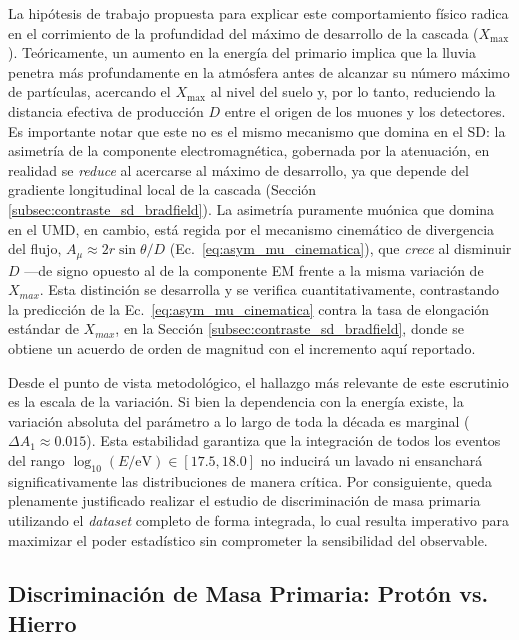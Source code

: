 La hipótesis de trabajo propuesta para explicar este comportamiento físico radica en el corrimiento de la profundidad del máximo de desarrollo de la cascada ($X_{\mathrm{max}}$). Teóricamente, un aumento en la energía del primario implica que la lluvia penetra más profundamente en la atmósfera antes de alcanzar su número máximo de partículas, acercando el $X_{\mathrm{max}}$ al nivel del suelo y, por lo tanto, reduciendo la distancia efectiva de producción $D$ entre el origen de los muones y los detectores. Es importante notar que este no es el mismo mecanismo que domina en el SD: la asimetría de la componente electromagnética, gobernada por la atenuación, en realidad se \textit{reduce} al acercarse al máximo de desarrollo, ya que depende del gradiente longitudinal local de la cascada (Sección \ref{subsec:contraste_sd_bradfield}). La asimetría puramente muónica que domina en el UMD, en cambio, está regida por el mecanismo cinemático de divergencia del flujo, $A_\mu \approx 2r\sin\theta/D$ (Ec.~\ref{eq:asym_mu_cinematica}), que \textit{crece} al disminuir $D$ —de signo opuesto al de la componente EM frente a la misma variación de $X_{max}$. Esta distinción se desarrolla y se verifica cuantitativamente, contrastando la predicción de la Ec.~\ref{eq:asym_mu_cinematica} contra la tasa de elongación estándar de $X_{max}$, en la Sección \ref{subsec:contraste_sd_bradfield}, donde se obtiene un acuerdo de orden de magnitud con el incremento aquí reportado.

Desde el punto de vista metodológico, el hallazgo más relevante de este escrutinio es la escala de la variación. Si bien la dependencia con la energía existe, la variación absoluta del parámetro a lo largo de toda la década es marginal ($\Delta A_1 \approx 0.015$). Esta estabilidad garantiza que la integración de todos los eventos del rango $\log_{10}(E/\mathrm{eV}) \in [17.5, 18.0]$ no inducirá un lavado ni ensanchará significativamente las distribuciones de manera crítica. Por consiguiente, queda plenamente justificado realizar el estudio de discriminación de masa primaria utilizando el \textit{dataset} completo de forma integrada, lo cual resulta imperativo para maximizar el poder estadístico sin comprometer la sensibilidad del observable.

\subsection{Discriminación de Masa Primaria: Protón vs. Hierro}
\label{sec:discriminacion_masa}

